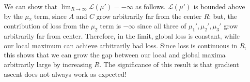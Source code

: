We can show that $\lim_{R\rightarrow \infty}\mathcal{L}(\mu') = -\infty$ as follows. $\mathcal{L}(\mu')$ is bounded above by the $\mu_2$ term, since $A$ and $C$ grow arbitrarily far from the center $R$; but, the contribution of loss from the $\mu_2$ term is $-\infty$ since all three of $\mu_1', \mu_2', \mu_3'$ grow arbitrarily far from center. Therefore, in the limit, global loss is constant, while our local maximum can achieve arbitrarily bad loss. Since loss is continuous in $R$, this shows that we can grow the gap between our local and global maxima arbitrarily large by increasing $R$. The significance of this result is that gradient ascent does not always work as expected!
